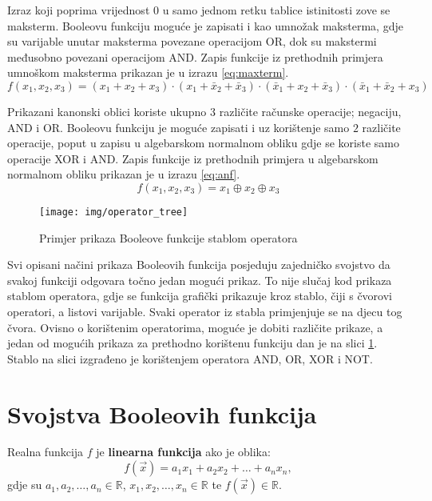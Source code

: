 Izraz koji poprima vrijednost $0$ u samo jednom retku tablice istinitosti zove se maksterm.
Booleovu funkciju moguće je zapisati i kao umnožak maksterma, gdje su varijable unutar maksterma povezane operacijom OR, dok su makstermi međusobno povezani operacijom AND.
Zapis funkcije iz prethodnih primjera umnoškom maksterma prikazan je u izrazu \eqref{eq:maxterm}.
\begin{equation}\label{eq:maxterm}
    f(x_1, x_2, x_3) = \left(x_1 + x_2 + x_3\right) \cdot \left(x_1 + \bar{x}_2 + \bar{x}_3\right) \cdot \left(\bar{x}_1 + x_2 + \bar{x}_3\right) \cdot \left(\bar{x}_1 + \bar{x}_2 + x_3\right)
\end{equation}

Prikazani kanonski oblici koriste ukupno $3$ različite računske operacije; negaciju, AND i OR.
Booleovu funkciju je moguće zapisati i uz korištenje samo $2$ različite operacije, poput u zapisu u algebarskom normalnom obliku gdje se koriste samo operacije XOR i AND.
Zapis funkcije iz prethodnih primjera u algebarskom normalnom obliku prikazan je u izrazu \eqref{eq:anf}.
\begin{equation}\label{eq:anf}
    f(x_1, x_2, x_3) = x_1 \oplus x_2 \oplus x_3
\end{equation}

\begin{figure}[ht!] 
    \centering
    \texttt{[image: img/operator\_tree]}
    \captionsetup{justification=centering}
    \caption{Primjer prikaza Booleove funkcije stablom operatora}
    \label{fig:operator_tree}
\end{figure}
Svi opisani načini prikaza Booleovih funkcija posjeduju zajedničko svojstvo da svakoj funkciji odgovara točno jedan mogući prikaz.
To nije slučaj kod prikaza stablom operatora, gdje se funkcija grafički prikazuje kroz stablo, čiji s čvorovi operatori, a listovi varijable.
Svaki operator iz stabla primjenjuje se na djecu tog čvora.
Ovisno o korištenim operatorima, moguće je dobiti različite prikaze, a jedan od mogućih prikaza za prethodno korištenu funkciju dan je na slici \ref{fig:operator_tree}.
Stablo na slici izgrađeno je korištenjem operatora AND, OR, XOR i NOT.


\section{Svojstva Booleovih funkcija}

Realna funkcija $f$ je \textbf{linearna funkcija} ako je oblika:
\begin{equation}
    f(\vec{x}) = a_1x_1 + a_2x_2 + \dots + a_nx_n,
\end{equation}
gdje su $a_1, a_2, \dots, a_n \in \mathds{R}$, $x_1, x_2, \dots, x_n \in \mathds{R}$ te $f(\vec{x}) \in \mathds{R}$.

